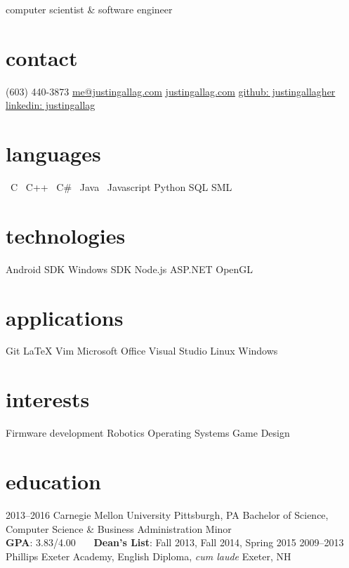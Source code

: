 \documentclass[]{friggeri-cv}
\newcommand{\starr}{\raisebox{0.2ex}{$\star $}}
\begin{document}
    {computer scientist \& software engineer}

    \begin{aside}
        \section{contact}
            (603) 440-3873
            \href{mailto:me@justingallag.com}{me@justingallag.com}
            \href{http://justingallag.com}{justingallag.com}
            \href{https://github.com/justingallagher}{github: justingallagher}
            \href{https://www.linkedin.com/in/justingallag}{linkedin: justingallag}
        \section{languages}
            \starr \ C
            \starr \ C++
            \starr \ C\#
            \starr \ Java
            \starr \ Javascript
            Python
            SQL
            SML
        \section{technologies}
            Android SDK
            Windows SDK
            Node.js
            ASP.NET
            OpenGL
        \section{applications}
            Git
            LaTeX
            Vim
            Microsoft Office
            Visual Studio
            Linux
            Windows
        \section{interests}
            Firmware development
            Robotics
            Operating Systems
            Game Design
    \end{aside}

    \section{education}

    \begin{entrylist}
        \entry
            {2013--2016}
            {Carnegie Mellon University}
            {Pittsburgh, PA}
            {Bachelor of Science, Computer Science \& Business Administration Minor\\
            \textbf{GPA}: 3.83/4.00 \ \ \ \textbf{Dean's List}: Fall 2013, Fall 2014, Spring 2015}
        \entrys
            {2009--2013}
            {Phillips Exeter Academy, {\normalfont English Diploma, \emph{cum laude}}}
            {Exeter, NH}
            {}
    \end{entrylist}
\end{document}
